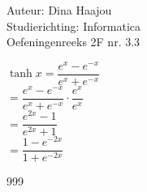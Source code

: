 \documentclass[a4paper]{article}
\begin{document}
  
\noindent \large Auteur: Dina Haajou \\
\noindent \large Studierichting: Informatica\\
\noindent \large Oefeningenreeks 2F nr. 3.3 \\

\medskip

\normalsize

$\tanh x = \dfrac{e^x - e^{-x}}{e^x + e^{-x}}$ \\

$= \dfrac{e^x - e^{-x}}{e^x + e^{-x}} \cdot \dfrac{e^x}{e^x}$ \\

$= \dfrac{e^{2x} - 1}{e^{2x} + 1}$ \\

$= \dfrac{1 - e^{-2x}}{1 + e^{-2x}}$ \\

\begin{thebibliography}{999}
\end{thebibliography}
\end{document}
